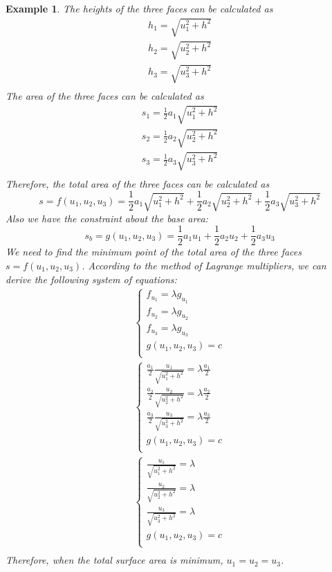\documentclass{article}
\newtheorem{example}{Example}
\begin{document}
\begin{example}
  The heights of the three faces can be calculated as
  \begin{gather*}
    h_1 = \sqrt{u_1^2 + h^2} \\
    h_2 = \sqrt{u_2^2 + h^2} \\
    h_3 = \sqrt{u_3^2 + h^2} \\
  \end{gather*}
  The area of the three faces can be calculated as
  \begin{gather*}
    s_1 = \frac{1}{2}a_1\sqrt{u_1^2 + h^2} \\
    s_2 = \frac{1}{2}a_2\sqrt{u_2^2 + h^2} \\
    s_3 = \frac{1}{2}a_3\sqrt{u_3^2 + h^2} \\
  \end{gather*}
  Therefore, the total area of the three faces can be calculated as
  \begin{equation*}
    s = f(u_1, u_2, u_3) = \frac{1}{2}a_1\sqrt{u_1^2 + h^2} + \frac{1}{2}a_2\sqrt{u_2^2 + h^2} + \frac{1}{2}a_3\sqrt{u_3^2 + h^2}
  \end{equation*}
  Also we have the constraint about the base area:
  \begin{equation*}
    s_b = g(u_1, u_2, u_3) = \frac{1}{2}a_1u_1 + \frac{1}{2}a_2u_2 + \frac{1}{2}a_3u_3
  \end{equation*}
  We need to find the minimum point of the total area of the three faces 
  $s = f(u_1, u_2, u_3)$. According to the method of Lagrange multipliers, we 
  can derive the following system of equations:
  \begin{gather*}
    \begin{cases}
      f_{u_1} = \lambda g_{u_1} \\
      f_{u_2} = \lambda g_{u_2} \\
      f_{u_3} = \lambda g_{u_3} \\
      g(u_1, u_2, u_3) = c \\
    \end{cases} \\
    \begin{cases}
      \frac{a_1}{2}\frac{u_1}{\sqrt{u_1^2 + h^2}} = \lambda \frac{a_1}{2} \\
      \frac{a_2}{2}\frac{u_2}{\sqrt{u_2^2 + h^2}} = \lambda \frac{a_2}{2} \\
      \frac{a_3}{2}\frac{u_3}{\sqrt{u_3^2 + h^2}} = \lambda \frac{a_3}{2} \\
      g(u_1, u_2, u_3) = c \\
    \end{cases} \\
    \begin{cases}
      \frac{u_1}{\sqrt{u_1^2 + h^2}} = \lambda \\
      \frac{u_2}{\sqrt{u_2^2 + h^2}} = \lambda \\
      \frac{u_3}{\sqrt{u_3^2 + h^2}} = \lambda \\
      g(u_1, u_2, u_3) = c \\
    \end{cases} \\
  \end{gather*}
  Therefore, when the total surface area is minimum, $u_1 = u_2 = u_3$.
\end{example}
\end{document}
